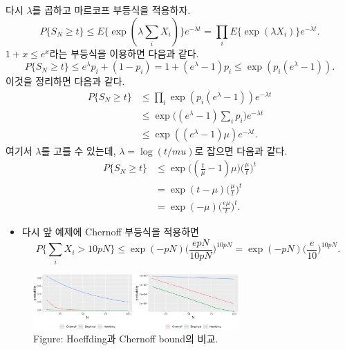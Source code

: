\documentclass[
  13pt,
  letterpaper,
  DIV=11,
  numbers=noendperiod]{scrreprt}
\providecommand{\tightlist}{%
  \setlength{\itemsep}{0pt}\setlength{\parskip}{0pt}}\usepackage{longtable,booktabs,array}
\theoremstyle{plain}
\theoremstyle{definition}
\theoremstyle{definition}
\theoremstyle{plain}
\theoremstyle{definition}
\theoremstyle{plain}
\theoremstyle{remark}
\begin{document}
\begin{tcolorbox}[enhanced jigsaw, opacitybacktitle=0.6, bottomrule=.15mm, title=\textcolor{quarto-callout-note-color}{\faInfo}\hspace{0.5em}{Proof}, leftrule=.75mm, rightrule=.15mm, arc=.35mm, left=2mm, titlerule=0mm, colbacktitle=quarto-callout-note-color!10!white, bottomtitle=1mm, colframe=quarto-callout-note-color-frame, toptitle=1mm, coltitle=black, breakable, colback=white, toprule=.15mm, opacityback=0]

다시 \(\lambda\)를 곱하고 마르코프 부등식을 적용하자. \[
P\{ S_N \geq t \} \leq E\{ \exp (\lambda \sum_{i} X_i) \}e^{-\lambda t} = \prod_i E\{ \exp (\lambda X_i) \}e^{-\lambda t}.
\] \(1+x \leq e^{x}\)라는 부등식을 이용하면 다음과 같다. \[
P\{ S_N \geq t \} \leq  e^{\lambda}p_i + (1-p_i) = 1 + (e^{\lambda} - 1)p_i \leq \exp (p_i (e^\lambda - 1)).
\] 이것을 정리하면 다음과 같다. \[
\begin{align*}
P\{ S_N \geq t \} &\leq \prod_i \exp (p_i (e^\lambda -1))e^{-\lambda t}\\
&\leq \exp \Big( (e^\lambda - 1)\sum_i p_i \Big) e^{-\lambda t}\\
&\leq \exp ((e^{\lambda}-1)\mu) e^{-\lambda t}.
\end{align*}
\] 여기서 \(\lambda\)를 고를 수 있는데, \(\lambda = \log (t/mu)\)로
잡으면 다음과 같다. \[
\begin{align*}
P\{ S_N \geq t \} &\leq \exp \Big( (\frac{t}{\mu}-1)\mu \Big) \Big( \frac{\mu}{t} \Big)^t\\
&= \exp (t-\mu) \Big( \frac{\mu}{t} \Big)^t\\
&=\exp (-\mu) \Big( \frac{e\mu}{t} \Big)^t.
\end{align*}
\]

\end{tcolorbox}

\begin{itemize}
\tightlist
\item
  다시 앞 예제에 Chernoff 부등식을 적용하면 \[
  P \{\sum_i X_i > 10pN \} \leq \exp (-p N) \Big( \frac{epN}{10pN}\Big)^{10pN} = \exp (-p N) \Big( \frac{e}{10}\Big)^{10pN}.
  \]
\end{itemize}

\begin{figure}[th]

{\centering \includegraphics[width=0.7\textwidth,height=\textheight]{ineq_files/figure-pdf/unnamed-chunk-5-1.pdf}

}

\caption{Figure: Hoeffding과 Chernoff bound의 비교.}

\end{figure}%
\end{document}
